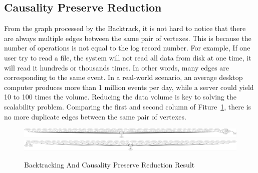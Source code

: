 \subsection{Causality Preserve Reduction}
From the graph processed by the Backtrack, it is not hard to notice that there are always multiple edges between the same pair of vertexes. This is because the number of operations is not equal to the log record number. For example, If one user try to read a file, the system will not read all data from disk at one time, it will read it hundreds or thousands times. In other words, many edges are corresponding to the same event. In a real-world scenario, an average desktop computer produces more than 1 million events per day, while a server could yield 10 to 100 times the volume. 
Reducing the data volume is key to solving the scalability problem. Comparing the first and second column of Fiture~\ref{fig:backandCPR}, there is no more duplicate edges between the same pair of vertexes.
\begin{figure}[htbp]
	\begin{minipage}[t][0.8\textheight]{0.5\textwidth}
		\centering
		\includegraphics[align=c, width=\textheight,angle=90]{fileBack.jpg}
		\hspace{0.1\textwidth}
		\includegraphics[align=c, width=\textheight,angle=90]{fileCPR.jpg}
	\end{minipage}
	\caption{Backtracking And Causality Preserve Reduction Result}
	\label{fig:backandCPR}
\end{figure}


